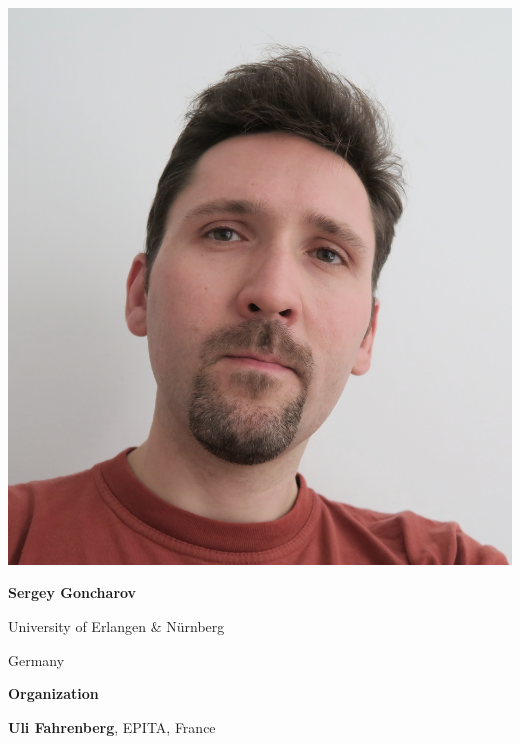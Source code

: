 \documentclass[a3paper, 12pt]{article}
\begin{document}
\begin{minipage}[t]{.43\linewidth}
  \begin{minipage}{.2\linewidth}
    \includegraphics[width=\linewidth, trim=15pt 0 0 0, clip]{goncharov2}
  \end{minipage}
  \hfill
  \begin{minipage}{.75\linewidth}
    \textbf{Sergey Goncharov}

    University of Erlangen \& Nürnberg

    Germany
  \end{minipage}

  \medskip
  

  \vspace*{7ex}
  
  \hfill {\Large \bf Organization}

  \smallskip

  \hfill \textbf{Uli Fahrenberg}, EPITA, France


\end{minipage}
\end{document}

